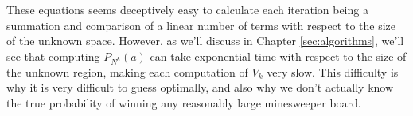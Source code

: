 
These equations seems deceptively easy to calculate each iteration being a summation and comparison of a linear number of terms with respect to the size of the unknown space. However, as we'll discuss in Chapter \ref{sec:algorithms}, we'll see that computing $P_{N^k}(a)$ can take exponential time with respect to the size of the unknown region, making each computation of $V_k$ very slow. This difficulty is why it is very difficult to guess optimally, and also why we don't actually know the true probability of winning any reasonably large minesweeper board.\\